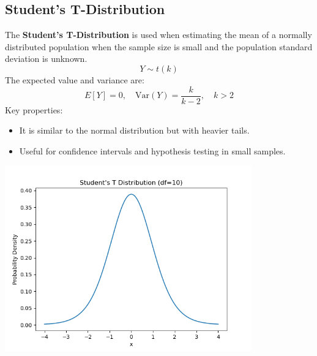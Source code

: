 \documentclass{article}
\begin{document}
\subsection{Student's T-Distribution}
The \textbf{Student's T-Distribution} is used when estimating the mean of a normally distributed population when the sample size is small and the population standard deviation is unknown.
\[
Y \sim t(k)
\]
The expected value and variance are:
\[
E[Y] = 0, \quad \text{Var}(Y) = \frac{k}{k-2}, \quad k > 2
\]
Key properties:
\begin{itemize}
    \item It is similar to the normal distribution but with heavier tails.
    \item Useful for confidence intervals and hypothesis testing in small samples.
\end{itemize}
\begin{center}
    \includegraphics[width=0.8\textwidth]{./graphs/probDist/t_distribution.png}
\end{center}

\newpage
\end{document}
